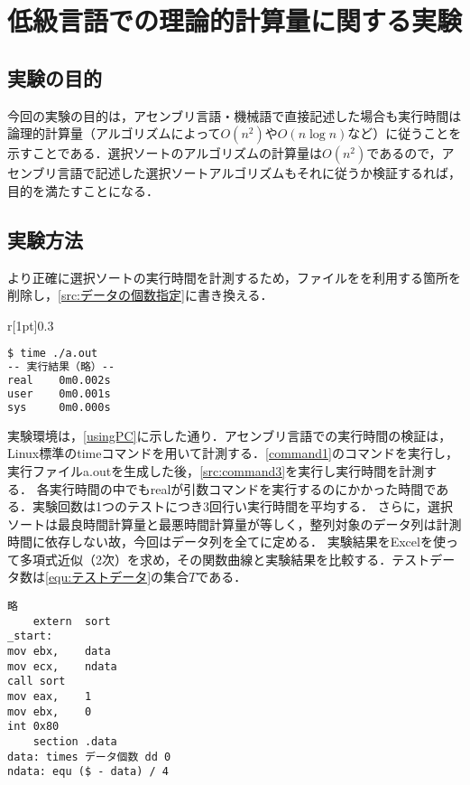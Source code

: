 \chapter{低級言語での理論的計算量に関する実験}\label{chap:時間計測}
\section{実験の目的}
今回の実験の目的は，アセンブリ言語・機械語で直接記述した場合も実行時間は論理的計算量（アルゴリズムによって\(O(n^2)\)や\(O(n\log n)\)など）に従うことを示すことである．選択ソートのアルゴリズムの計算量は\(O(n^2)\)である\cite[p.50,51]{アルゴリズムとデータ構造}ので，アセンブリ言語で記述した選択ソートアルゴリズムもそれに従うか検証するれば，目的を満たすことになる．
\section{実験方法}\label{sec:時間計測}
より正確に選択ソートの実行時間を計測するため，\testsort ファイルを\print を利用する箇所を削除し，\ref{src:データの個数指定}に書き換える．\par
\begin{wrapfigure}{r}[1pt]{0.3\textwidth}
    \vspace{-3em}
    \begin{lstlisting}[language={Bash},caption={実行コマンド},label={src:command3},frame={single},numbers={none}]
$ time ./a.out
-- 実行結果（略）--
real    0m0.002s
user    0m0.001s
sys     0m0.000s
\end{lstlisting}
    \vspace{-3em}
\end{wrapfigure}
実験環境は，\ref{usingPC}に示した通り．アセンブリ言語での実行時間の検証は，Linux標準の{\ttfamily time}コマンドを用いて計測する．\ref{command1}のコマンドを実行し，実行ファイル{\ttfamily a.out}を生成した後，\ref{src:command3}を実行し実行時間を計測する．
各実行時間の中でも{\ttfamily real}が引数コマンドを実行するのにかかった時間である．実験回数は1つのテストにつき3回行い実行時間を平均する．
さらに，選択ソートは最良時間計算量と最悪時間計算量が等しく\cite[p.50]{アルゴリズムとデータ構造}，整列対象のデータ列は計測時間に依存しない故，今回はデータ列を全て{}に定める．
実験結果をExcelを使って多項式近似（2次）を求め，その関数曲線と実験結果を比較する．テストデータ数は\eqref{equ:テストデータ}の集合\(T\)である．\\
\begin{minipage}[c]{0.43\textwidth}
    \centering
    \hspace*{2em}
    \begin{lstlisting}[caption={\testsort}, label={src:データの個数指定},frame={single},numbers={none}]
略
    extern  sort
_start:
mov ebx,    data
mov ecx,    ndata
call sort
mov eax,    1
mov ebx,    0
int 0x80
    section .data
data: times データ個数 dd 0
ndata: equ ($ - data) / 4
    \end{lstlisting}
\end{minipage}
